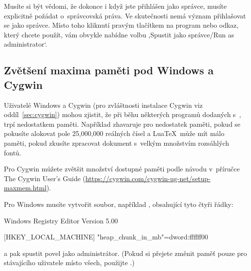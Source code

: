 \documentclass[\classoptions,slovak,english,czech]{\classname}
\newcommand{\singleuv}[1]{,#1`}
\begin{document}
Musíte si být vědomi, že dokonce i když jste 
přihlášen jako správce,
musíte explicitně požádat o~správcovská práva. Ve skutečnosti nemá význam
přihlašovat se jako správce. Místo toho kliknutí pravým 
tlačítkem na program nebo odkaz,
který chcete použít, vám obvykle nabídne volbu
\singleuv{Spustit jako správce/Run as administrator}.


\subsection{Zvětšení maxima paměti pod Windows a Cygwin}
\label{sec:cygwin-maxmem}

Uživatelé Windows a Cygwin (pro zvláštnosti
instalace Cygwin viz oddíl~\ref{sec:cygwin}) 
mohou zjistit, že při běhu některých programů dodaných s~\TL, 
trpí nedostatkem paměti.  Například  zhavaruje pro 
nedostatek paměti,
pokud se pokusíte alokovat pole 25,000,000 reálných čísel a
Lua\TeX\ může mít málo paměti, pokud zkusíte zpracovat dokument
s~velkým množstvím rozsáhlých fontů.

Pro Cygwin můžete zvětšit množství dostupné paměti podle
návodu v~příručce The Cygwin User's Guide
(\url{https://cygwin.com/cygwin-ug-net/setup-maxmem.html}).

Pro Windows musíte vytvořit soubor, například , obsahující
tyto čtyři řádky:

\begin{sverbatim}
Windows Registry Editor Version 5.00

[HKEY_LOCAL_MACHINE\Software\Cygwin]
"heap_chunk_in_mb"=dword:ffffff00
\end{sverbatim}

\noindent a pak spustit povel  jako
administrátor.  (Pokud si přejete změnit paměť pouze pro
stávajícího uživatele místo všech, použijte .)
\end{document}
